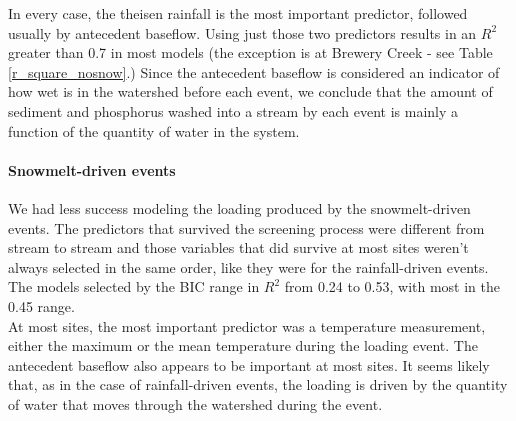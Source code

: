 \documentclass[12pt]{article}
\begin{document}
In every case, the theisen rainfall is the most important predictor, followed usually by antecedent baseflow. Using just those two predictors results in an $R^2$ greater than 0.7 in most models (the exception is at Brewery Creek - see Table \ref{r_square_nosnow}.) Since the antecedent baseflow is considered an indicator of how wet is in the watershed before each event, we conclude that the amount of sediment and phosphorus washed into a stream by each event is mainly a function of the quantity of water in the system.\\

\paragraph{Snowmelt-driven events} We had less success modeling the loading produced by the snowmelt-driven events. The predictors that survived the screening process were different from stream to stream and those variables that did survive at most sites weren't always selected in the same order, like they were for the rainfall-driven events. The models selected by the BIC range in $R^2$ from 0.24 to 0.53, with most in the 0.45 range.\\

At most sites, the most important predictor was a temperature measurement, either the maximum or the mean temperature during the loading event. The antecedent baseflow also appears to be important at most sites. It seems likely that, as in the case of rainfall-driven events, the loading is driven by the quantity of water that moves through the watershed during the event.
\end{document}
